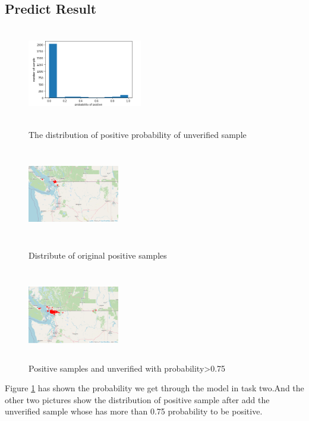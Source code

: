 \documentclass[12pt]{article}
\begin{document}
\subsection{Predict Result}

\begin{figure}[H]
	\small
	\centering
	\begin{minipage}{5cm}
		\label{prob}
		\includegraphics[width=5cm,height=4cm]{./pictures/prob.png}
		\caption{The distribution of positive probability of unverified sample} 
	\end{minipage}
	\begin{minipage}{4cm}
		\includegraphics[width=4cm,height=4cm]{./pictures/pos.png}
		\caption{Distribute of original positive samples}
	\end{minipage}
	\begin{minipage}{4cm}
		\includegraphics[width=4cm,height=4cm]{./pictures/addun.png}
		\caption{Positive samples and unverified with probability>0.75}
	\end{minipage}
\end{figure}
Figure \ref{prob} has shown the probability we get through the model in task two.And the other two pictures show the distribution of positive sample after add the unverified sample whose has more than 0.75 probability to be positive.
\end{document}
